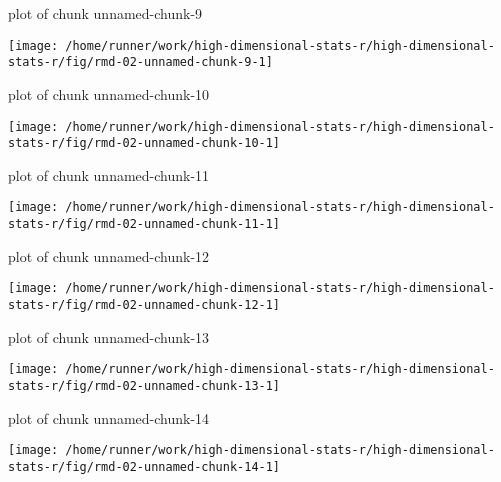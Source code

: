 \documentclass[ignorenonframetext,]{beamer}
\begin{document}
\begin{frame}{plot of chunk unnamed-chunk-9}
\protect\hypertarget{plot-of-chunk-unnamed-chunk-9}{}

\texttt{[image: /home/runner/work/high-dimensional-stats-r/high-dimensional-stats-r/fig/rmd-02-unnamed-chunk-9-1]}



\end{frame}

\begin{frame}{plot of chunk unnamed-chunk-10}
\protect\hypertarget{plot-of-chunk-unnamed-chunk-10}{}

\texttt{[image: /home/runner/work/high-dimensional-stats-r/high-dimensional-stats-r/fig/rmd-02-unnamed-chunk-10-1]}



\end{frame}

\begin{frame}{plot of chunk unnamed-chunk-11}
\protect\hypertarget{plot-of-chunk-unnamed-chunk-11}{}

\texttt{[image: /home/runner/work/high-dimensional-stats-r/high-dimensional-stats-r/fig/rmd-02-unnamed-chunk-11-1]}



\end{frame}

\begin{frame}{plot of chunk unnamed-chunk-12}
\protect\hypertarget{plot-of-chunk-unnamed-chunk-12}{}

\texttt{[image: /home/runner/work/high-dimensional-stats-r/high-dimensional-stats-r/fig/rmd-02-unnamed-chunk-12-1]}



\end{frame}

\begin{frame}{plot of chunk unnamed-chunk-13}
\protect\hypertarget{plot-of-chunk-unnamed-chunk-13}{}

\texttt{[image: /home/runner/work/high-dimensional-stats-r/high-dimensional-stats-r/fig/rmd-02-unnamed-chunk-13-1]}



\end{frame}

\begin{frame}{plot of chunk unnamed-chunk-14}
\protect\hypertarget{plot-of-chunk-unnamed-chunk-14}{}

\texttt{[image: /home/runner/work/high-dimensional-stats-r/high-dimensional-stats-r/fig/rmd-02-unnamed-chunk-14-1]}



\end{frame}
\end{document}
